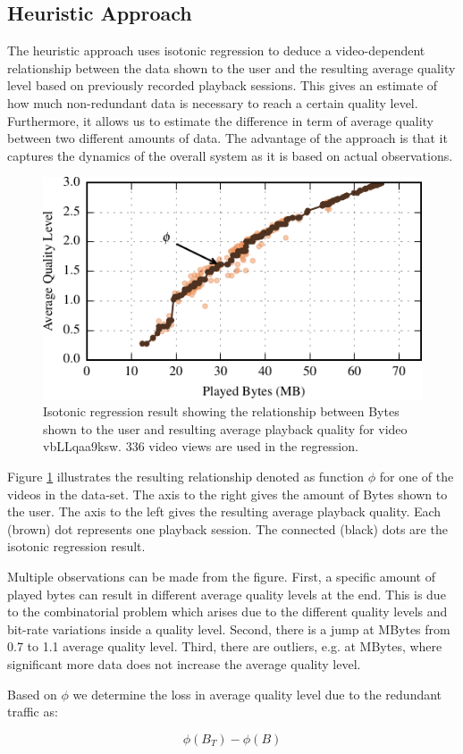 
\subsection{Heuristic Approach}

The heuristic approach uses isotonic regression \cite{barlow1972statistical} to deduce a video-dependent relationship between the data shown to the user and the resulting average quality level based on previously recorded playback sessions.
This gives an estimate of how much non-redundant data is necessary to reach a certain quality level.
Furthermore, it allows us to estimate the difference in term of average quality between two different amounts of data.
The advantage of the approach is that it captures the dynamics of the overall system as it is based on actual observations.

\begin{figure}[t]
\centering
\includegraphics[width=0.9\linewidth]{figs/32_vbLLqaa9ksw.pdf}%
\caption{Isotonic regression result showing the relationship between Bytes shown to the user and resulting average playback quality for video vbLLqaa9ksw. 336 video views are used in the regression.}
\label{fig:heuristic}%
\end{figure}

Figure \ref{fig:heuristic} illustrates the resulting relationship denoted as function $\phi$ for one of the videos in the data-set.
The axis to the right gives the amount of Bytes shown to the user.
The axis to the left gives the resulting average playback quality.
Each (brown) dot represents one playback session.
The connected (black) dots are the isotonic regression result.

Multiple observations can be made from the figure. 
First, a specific amount of played bytes can result in different average quality levels at the end. 
This is due to the combinatorial problem which arises due to the different quality levels and bit-rate variations inside a quality level.
Second, there is a jump at \unit[20]{MBytes} from 0.7 to 1.1 average quality level.
Third, there are outliers, e.g. at \unit[27]{MBytes}, where significant more data does not increase the average quality level.

Based on $\phi$ we determine the loss in average quality level due to the redundant traffic as:

\begin{equation}
\phi(B_T) - \phi(B)
\end{equation}
